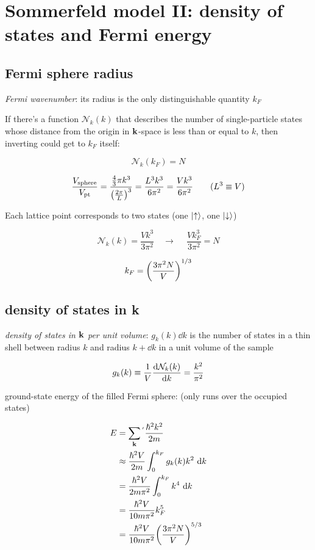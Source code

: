 \documentclass[10pt, a4paper, twocolumn]{article}
\newcommand{\deff}[1]{\par \noindent \textit{#1}: }
\newcommand{\arr}{\ensuremath{\longrightarrow\ }}
\begin{document}
\section{Sommerfeld model II: density of states and Fermi energy}

\subsection{Fermi sphere radius}

\deff{Fermi wavenumber}
its radius is the only distinguishable quantity $k_F$

If there's a function $\mathcal N_k(k)$ that describes the number of single-particle states whose distance from the origin in $\vb k$-space is less than or equal to $k$, then inverting could get to $k_F$ itself:

\[ \mathcal N_k (k_F) = N \]


\[ \frac{V_\mathrm{sphere}}{V_\mathrm{pt}}
= \frac{\frac43 \pi k^3}{\qty(\frac{2 \pi}{L})^3}
= \frac{L^3k^3}{6\pi ^2}
= \frac{Vk^3}{6\pi ^2}
\qquad (L^3 \equiv V) \]

Each lattice point corresponds to two states
(one $\ket{\uparrow}$, one $\ket{\downarrow}$)

\[ \mathcal N _k (k) = \frac{V k^3}{3 \pi ^2}
\quad \arr \quad
\frac{V k_F^3}{3 \pi ^2} = N\]

\[ k_F = \qty(\frac{3 \pi ^2 N}{V})^{1/3} \]

\subsection{density of states in k}

\deff{density of states in $\vb k$ per unit volume}
$g _k(k) \dd k$
is the number of states in a thin shell between radius $k$ and radius $k + \dd k$ in a unit volume of the sample 

\[ g_k (k) \equiv \frac1V \dv{\mathcal N _k(k)}{k}
= \frac{k^2}{\pi ^2} \]

ground-state energy of the filled Fermi sphere:
(only runs over the occupied states)

\begin{equation*}
\begin{aligned}
E &= \sum _{\vb k}^{}{}^{'} \frac{\hbar^2 k^2}{2m}
\\ & \approx \frac{\hbar ^2 V}{2m} \int _0^{k_F}
g_k (k) k^2 \ \dd k
\\ &= \frac{\hbar ^2 V}{2m \pi ^2} \int _0 ^{k_F}
k^4 \ \dd k
\\ &= \frac{\hbar ^2 V}{10 m \pi ^2} k_F^5
\\ &= \frac{\hbar ^2 V}{10 m \pi ^2}
\qty( \frac{3 \pi ^2 N}{V})^{5/3}
\end{aligned}
\end{equation*}
\end{document}
